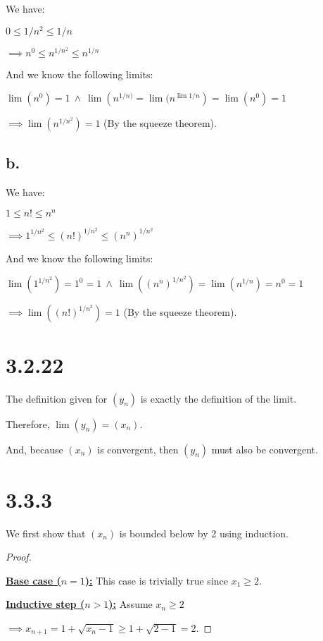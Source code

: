 \documentclass{article}
\begin{document}
We have:

$0 \leq 1/n^2 \leq 1/n$

\noindent
$\implies n^0 \leq n^{1/n^2} \leq n^{1/n}$

\noindent
And we know the following limits:

$\lim(n^0) = 1 \ \land \ \lim{(n^{1/n)} = \lim{(n^{\lim{1/n}}})} = \lim{(n^0)}=1$

\noindent
$\implies \lim{(n^{1/n^2})} = 1$ (By the squeeze theorem).

\subsection*{b.}

We have:

$1 \leq n! \leq n^n $

\noindent
$\implies 1^{1/n^2} \leq (n!)^{1/n^2} \leq (n^n)^{1/n^2}$

\noindent
And we know the following limits:

$\lim{(1^{1/n^2})} = 1^0 = 1 \ \land \ \lim{((n^n)^{1/n^2})} = \lim{(n^{1/n})} = n^0 = 1$

\noindent
$\implies \lim{((n!)^{1/n^2})} = 1$ (By the squeeze theorem).

\section*{3.2.22}
The definition given for $(y_n)$ is exactly the definition of the limit.

\noindent
Therefore, $\lim{(y_n)} = (x_n)$.

\noindent
And, because $(x_n)$ is convergent, then $(y_n)$ must also be convergent.


\section*{3.3.3}

We first show that $(x_n)$ is bounded below by 2 using induction.

\begin{proof}
  $ $

\textbf{\underline{Base case ($n=1$):}} This case is trivially true since $x_1 \geq 2$.
\newline

\textbf{\underline{Inductive step ($n>1$):}} Assume $x_n \geq 2$

$\implies x_{n+1} = 1 + \sqrt{x_n - 1} \geq 1 + \sqrt{2 - 1} = 2$.

\end{proof}
\end{document}
